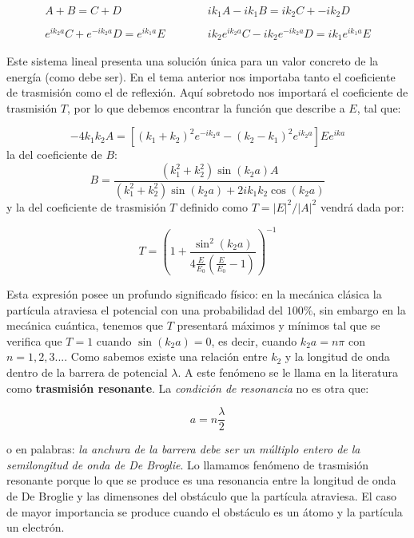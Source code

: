 \documentclass[12pt]{article}
\newcommand{\parentesis}[1]{\left( #1  \right)}
\newcommand{\ccorchetes}[1]{\left[ #1  \right]}
\newcommand{\tquad}{\quad \quad \quad}
\begin{document}
\begin{equation}
\begin{array}{cc} 
A + B = C + D \tquad & ik_1 A - i k_1 B = i k_2 C + - i k_2 D \\ \\
e^{ik_2a}C + e^{-ik_2a}D = e^{ik_1a}E \tquad & ik_2 e^{ik_2a} C - i k_2 e^{-ik_2a} D = i k_1 e^{ik_1a} E
\end{array}
\end{equation}

Este sistema lineal presenta una solución única para un valor concreto de la energía (como debe ser). En el tema anterior nos importaba tanto el coeficiente de trasmisión como el de reflexión. Aquí sobretodo nos importará el coeficiente de trasmisión $T$, por lo que debemos encontrar la función que describe a $E$, tal que:

\begin{equation}
-4 k_1 k_2 A = \ccorchetes{(k_1+k_2)^2 e^{-i k_2 a} - (k_2 - k_1)^2 e^{ik_2 a}}E e^{ika}
\end{equation}
la del coeficiente de $B$:
\begin{equation}
B = \dfrac{(k_1^2 + k_2^2) \sin (k_2 a) A}{(k_1^2 + k_2^2) \sin (k_2 a) + 2 i k_1 k_2 \cos (k_2 a)}
\end{equation}
y la del coeficiente de trasmisión $T$ definido como $T=|E|^2 / |A|^2$ vendrá dada por:

\begin{equation}
T = \parentesis{1+ \dfrac{\sin^2 (k_2 a)}{4 \frac{E}{E_0} \parentesis{\frac{E}{E_0}-1}}}^{-1}
\end{equation}

Esta expresión posee un profundo significado físico: en la mecánica clásica la partícula atraviesa el potencial con una probabilidad del $100\%$, sin embargo en la mecánica cuántica, tenemos que $T$ presentará máximos y mínimos tal que se verifica que $T=1$ cuando $\sin(k_2a)=0$, es decir, cuando $k_2 a = n \pi$ con $n=1,2,3...$. Como sabemos existe una relación entre $k_2$ y la longitud de onda dentro de la barrera de potencial $\lambda$. A este fenómeno se le llama en la literatura como \textbf{trasmisión resonante}. La \textit{condición de resonancia} no es otra que:

\begin{equation}
a = n \dfrac{\lambda}{2}
\end{equation}

o en palabras: \textit{la anchura de la barrera debe ser un múltiplo entero de la semilongitud de onda de De Broglie}. Lo llamamos fenómeno de trasmisión resonante porque lo que se produce es una resonancia entre la longitud de onda de De Broglie y las dimensones del obstáculo que la partícula atraviesa. El caso de mayor importancia se produce cuando el obstáculo es un átomo y la partícula un electrón. \\
\end{document}
